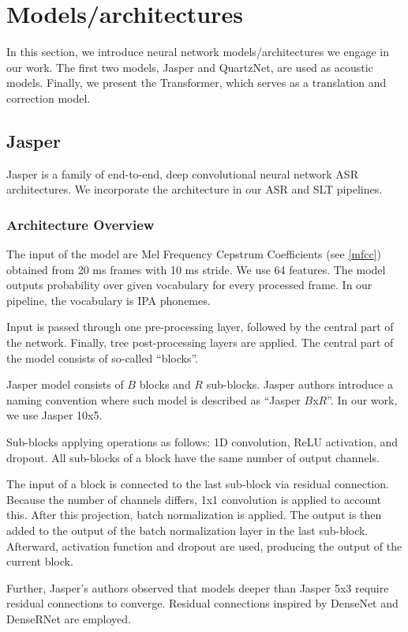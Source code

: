 \pagebreak
\section{Models/architectures}
In this section, we introduce neural network models/architectures we engage in our work. The first two models, Jasper and QuartzNet, are used as acoustic models. Finally, we present the Transformer, which serves as a translation and correction model.

\subsection{Jasper}

Jasper  is a family of end-to-end, deep convolutional neural network ASR architectures. We incorporate the architecture in our ASR and SLT pipelines.

\subsubsection{Architecture Overview}
The input of the model are Mel Frequency Cepstrum Coefficients (see \cref{mfcc}) obtained from 20 ms frames with 10 ms stride. We use 64 features. The model outputs probability over given vocabulary for every processed frame. In our pipeline, the vocabulary is IPA phonemes.

Input is passed through one pre-processing layer, followed by the central part of the network. Finally, tree post-processing layers are applied. The central part of the model consists of so-called ``blocks''.

Jasper model consists of $B$ blocks and $R$ sub-blocks. Jasper authors introduce a naming convention where such model is described as ``Jasper $B$x$R$''. In our work, we use Jasper 10x5.

Sub-blocks applying operations as follows: 1D convolution, ReLU activation, and dropout. All sub-blocks of a block have the same number of output channels. 

The input of a block is connected to the last sub-block via residual connection. Because the number of channels differs, 1x1 convolution is applied to account this. After this projection, batch normalization is applied. The output is then added to the output of the batch normalization layer in the last sub-block. Afterward, activation function and dropout are used, producing the output of the current block.

Further, Jasper's authors observed that models deeper than Jasper 5x3 require residual connections to converge. Residual connections inspired by DenseNet  and DenseRNet  are employed.

